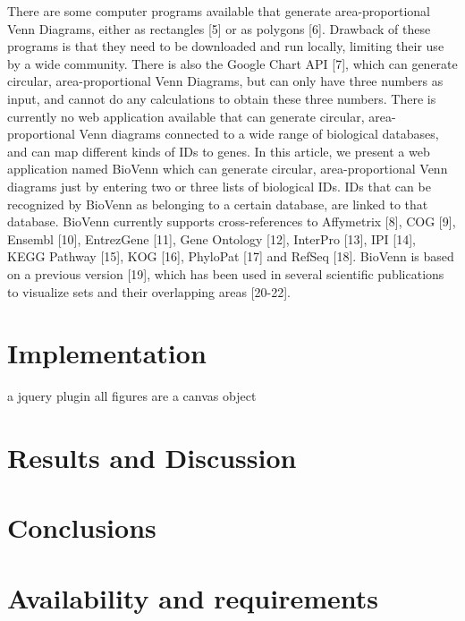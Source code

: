 \documentclass{bmcart}
\begin{document}
There are some computer programs available that generate area-proportional Venn Diagrams, either as rectangles 
[5] or as polygons [6]. Drawback of these programs is that they need to be downloaded and run locally, limiting 
their use by a wide community. There is also the Google Chart API [7], which can generate circular, area-proportional 
Venn Diagrams, but can only have three numbers as input, and cannot do any calculations to obtain these three numbers. 
There is currently no web application available that can generate circular, area-proportional Venn diagrams connected 
to a wide range of biological databases, and can map different kinds of IDs to genes. In this article, we present a 
web application named BioVenn which can generate circular, area-proportional Venn diagrams just by entering two or 
three lists of biological IDs. IDs that can be recognized by BioVenn as belonging to a certain database, are linked 
to that database. BioVenn currently supports cross-references to Affymetrix [8], COG [9], Ensembl [10], EntrezGene [11], 
Gene Ontology [12], InterPro [13], IPI [14], KEGG Pathway [15], KOG [16], PhyloPat [17] and RefSeq [18]. BioVenn is based 
on a previous version [19], which has been used in several scientific publications to visualize sets and their overlapping 
areas [20-22]. 

\section*{Implementation}
a jquery plugin 
all figures are a canvas object 

\section*{Results and Discussion}

\section*{Conclusions}

\section*{Availability and requirements}

\end{document}
